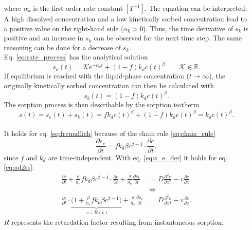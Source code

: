 where $\alpha_k$ is the first-order rate constant $[T^{-1}]$. The equation can be interpreted: A high dissolved concentration and a low kinetically sorbed concentration lead to a positive value on the right-hand side ($\alpha_k > 0$). Thus, the time derivative of $s_k$ is positive and an increase in $s_k$ can be observed for the next time step. The same reasoning can be done for a decrease of $s_k$.\\
Eq. \ref{eq:rate_process} has the analytical solution
\begin{equation}
    s_k(t) = \mathcal{K}e^{-\alpha_k t} + (1-f)k_dc(t)^{\beta} \qquad \mathcal{K} \in \mathbb{R}.
    \label{eq:sol_rate_process}
\end{equation}
If equilibrium is reached with the liquid-phase concentration ($t \rightarrow \infty$), the originally kinetically sorbed concentration can then be calculated with
\begin{equation}
    s_k(t) = (1-f)k_dc(t)^{\beta}.
\end{equation}
The sorption process is then describable by the sorption isotherm
\begin{equation}
    s(t) = s_e(t) + s_k(t) = fk_dc(t)^\beta + (1-f)k_dc(t)^\beta = k_dc(t)^\beta.
\end{equation}\\
It holds for eq. \ref{eq:freundlich} because of the chain rule \ref{eq:chain_rule}
\begin{equation}
    \frac{\partial s_e}{\partial t} = fk_d\beta c^{\beta-1}\cdot\frac{\partial c}{\partial t},
    \label{eq:s_e_der}
\end{equation}
since $f$ and $k_d$ are time-independent. With eq. \ref{eq:s_e_der} it holds for eq. \ref{eq:ad2ss}:
\begin{align}
    \frac{\partial c}{\partial t} + \frac{\rho}{n_e} fk_d\beta c^{\beta-1}\cdot\frac{\partial c}{\partial t} + \frac{\rho}{n_e} \frac{\partial s_k}{\partial t} &= D \frac{\partial^2c}{\partial x^2} - v\frac{\partial c}{\partial x}\nonumber\\
    &\Leftrightarrow \nonumber\\
    \frac{\partial c}{\partial t} \cdot \underbrace{\biggl(1 + \frac{\rho}{n_e} fk_d\beta c^{\beta-1}\biggr)}_{=:\:R(c)} + \frac{\rho}{n_e} \frac{\partial s_k}{\partial t} &= D \frac{\partial^2c}{\partial x^2} - v\frac{\partial c}{\partial x}.
    \label{eq:ad2ss_t}
\end{align}
$R$ represents the retardation factor resulting from instantaneous sorption.
